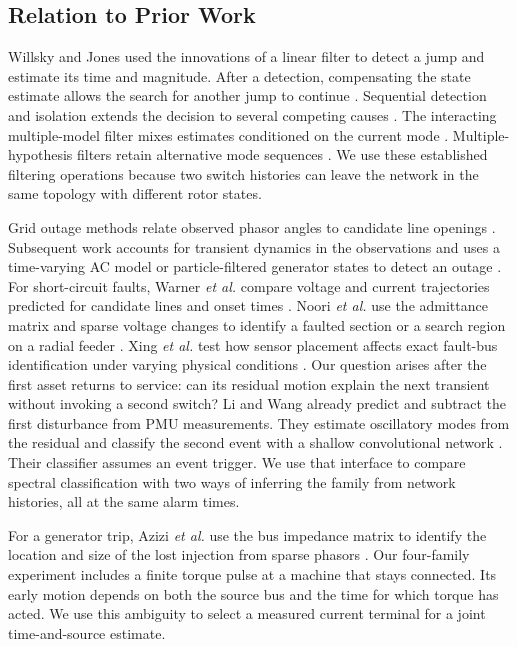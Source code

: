 \subsection{Relation to Prior Work}
\label{sec:narrative-related}

Willsky and Jones used the innovations of a linear filter to detect a jump
and estimate its time and magnitude. After a detection, compensating the
state estimate allows the search for another jump to continue
\cite{willsky1976glr}. Sequential detection and isolation extends the
decision to several competing causes \cite{nikiforov1995generalized,lai2000sequential}.
The interacting multiple-model filter mixes estimates conditioned on the
current mode \cite{blom1988imm}. Multiple-hypothesis filters retain
alternative mode sequences \cite{boers2005m3h}. We use these established
filtering operations because two switch histories can leave the network
in the same topology with different rotor states.

Grid outage methods relate observed phasor angles to candidate line
openings \cite{tate2008outage,chen2016quickest}. Subsequent work accounts
for transient dynamics in the observations \cite{rovatsos2017outage} and
uses a time-varying AC model or particle-filtered generator states to detect
an outage \cite{yang2020control,yang2021particle}. For short-circuit
faults, Warner \emph{et al.} compare voltage and current trajectories
predicted for candidate lines and onset times \cite{warner2023highfidelity}.
Noori \emph{et al.} use the admittance matrix and sparse voltage changes
to identify a faulted section or a search region on a radial feeder
\cite{noori2026circuit}. Xing \emph{et al.} test how sensor placement
affects exact fault-bus identification under varying physical conditions
\cite{xing2026placement}. Our question arises after the first asset
returns to service: can its residual motion explain the next transient
without invoking a second switch? Li and Wang already predict and subtract
the first disturbance from PMU measurements. They estimate oscillatory
modes from the residual and classify the second event with a shallow
convolutional network \cite{liwang2019successive}. Their classifier assumes
an event trigger. We use that interface to compare spectral classification
with two ways of inferring the family from network histories, all at the
same alarm times.

For a generator trip, Azizi \emph{et al.} use the bus impedance
matrix to identify the location and size of the lost injection from
sparse phasors \cite{azizi2021log}. Our four-family experiment includes
a finite torque pulse at a machine that stays connected.
Its early motion depends on both the source bus and
the time for which torque has acted. We use this ambiguity to select
a measured current terminal for a joint time-and-source estimate.

